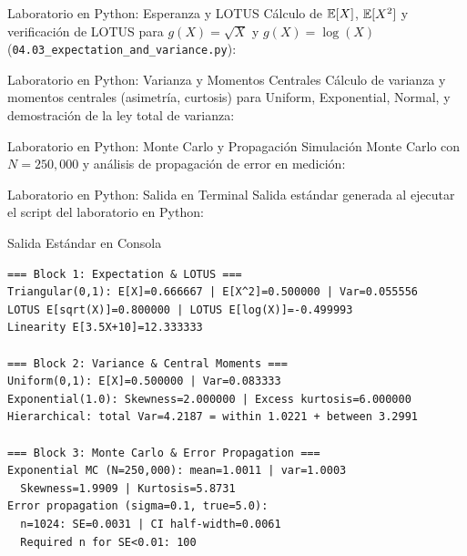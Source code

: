 \documentclass[10pt, aspectratio=169]{beamer}
\begin{document}
\begin{frame}[fragile]{Laboratorio en Python: Esperanza y LOTUS}
  \scriptsize
  Cálculo de $\mathbb{E}[X]$, $\mathbb{E}[X^2]$ y verificación de LOTUS para $g(X) = \sqrt{X}$ y $g(X) = \log(X)$ (\texttt{04.03\_expectation\_and\_variance.py}):
  \vspace{0.02cm}
  {
  }
\end{frame}

\begin{frame}[fragile]{Laboratorio en Python: Varianza y Momentos Centrales}
  \scriptsize
  Cálculo de varianza y momentos centrales (asimetría, curtosis) para Uniform, Exponential, Normal, y demostración de la ley total de varianza:
  \vspace{0.02cm}
  {
  }
\end{frame}

\begin{frame}[fragile]{Laboratorio en Python: Monte Carlo y Propagación}
  \scriptsize
  Simulación Monte Carlo con $N = 250{,}000$ y análisis de propagación de error en medición:
  \vspace{0.02cm}
  {
  }
\end{frame}

\begin{frame}[fragile]{Laboratorio en Python: Salida en Terminal}
  \scriptsize
  Salida estándar generada al ejecutar el script del laboratorio en Python:
  \vspace{0.02cm}
  \begin{block}{Salida Estándar en Consola}
    \fontsize{4pt}{5pt}\selectfont
    \begin{verbatim}
=== Block 1: Expectation & LOTUS ===
Triangular(0,1): E[X]=0.666667 | E[X^2]=0.500000 | Var=0.055556
LOTUS E[sqrt(X)]=0.800000 | LOTUS E[log(X)]=-0.499993
Linearity E[3.5X+10]=12.333333

=== Block 2: Variance & Central Moments ===
Uniform(0,1): E[X]=0.500000 | Var=0.083333
Exponential(1.0): Skewness=2.000000 | Excess kurtosis=6.000000
Hierarchical: total Var=4.2187 = within 1.0221 + between 3.2991

=== Block 3: Monte Carlo & Error Propagation ===
Exponential MC (N=250,000): mean=1.0011 | var=1.0003
  Skewness=1.9909 | Kurtosis=5.8731
Error propagation (sigma=0.1, true=5.0):
  n=1024: SE=0.0031 | CI half-width=0.0061
  Required n for SE<0.01: 100
    \end{verbatim}
  \end{block}
\end{frame}
\end{document}
